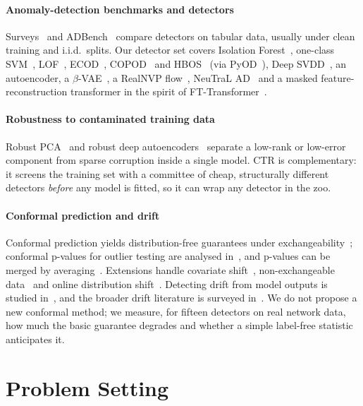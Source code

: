 \documentclass[journal]{IEEEtran}
\begin{document}
\paragraph*{Anomaly-detection benchmarks and detectors}
Surveys~\cite{chandola2009,pang2021,ruff2021} and ADBench~\cite{han2022} compare detectors on tabular data, usually under clean training and i.i.d.\ splits. Our detector set covers Isolation Forest~\cite{liu2008}, one-class SVM~\cite{scholkopf2001}, LOF~\cite{breunig2000}, ECOD~\cite{li2022}, COPOD~\cite{li2020} and HBOS~\cite{goldstein2012} (via PyOD~\cite{zhao2019}), Deep SVDD~\cite{ruff2018}, an autoencoder, a $\beta$-VAE~\cite{kingma2014,higgins2017}, a RealNVP flow~\cite{dinh2017}, NeuTraL AD~\cite{qiu2021} and a masked feature-reconstruction transformer in the spirit of FT-Transformer~\cite{gorishniy2021}.

\paragraph*{Robustness to contaminated training data}
Robust PCA~\cite{candes2011} and robust deep autoencoders~\cite{zhou2017} separate a low-rank or low-error component from sparse corruption inside a single model. CTR is complementary: it screens the training set with a committee of cheap, structurally different detectors \emph{before} any model is fitted, so it can wrap any detector in the zoo.

\paragraph*{Conformal prediction and drift}
Conformal prediction yields distribution-free guarantees under exchangeability~\cite{vovk2005,lei2018,angelopoulos2023}; conformal p-values for outlier testing are analysed in~\cite{bates2023}, and p-values can be merged by averaging~\cite{vovk2020}. Extensions handle covariate shift~\cite{tibshirani2019}, non-exchangeable data~\cite{barber2023} and online distribution shift~\cite{gibbs2021}. Detecting drift from model outputs is studied in~\cite{rabanser2019}, and the broader drift literature is surveyed in~\cite{gama2014,lu2019}. We do not propose a new conformal method; we measure, for fifteen detectors on real network data, how much the basic guarantee degrades and whether a simple label-free statistic anticipates it.

\section{Problem Setting}
\label{sec:setting}
\end{document}
